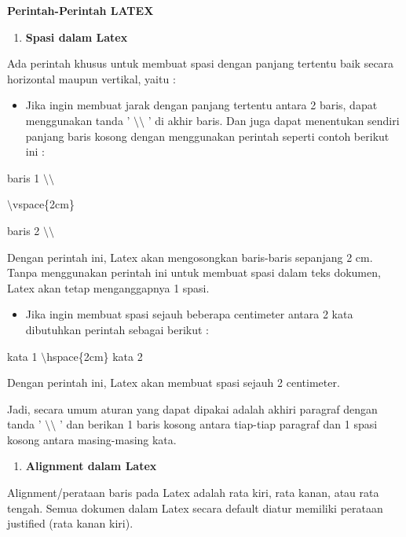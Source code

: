 \textbf{Perintah-Perintah LATEX}

\begin{enumerate}
\item \textbf{Spasi dalam Latex}
\setcounter{numberedCntB}{\theenumi}
\end{enumerate}
Ada perintah khusus untuk membuat spasi dengan panjang tertentu baik secara horizontal maupun vertikal, yaitu :

\begin{itemize}
\item Jika ingin membuat jarak dengan panjang tertentu antara 2 baris, dapat menggunakan tanda ' $\setminus$$\setminus$ ' di akhir baris. Dan juga dapat menentukan sendiri panjang baris kosong dengan menggunakan perintah seperti contoh berikut ini :
\end{itemize}
\hspace{0,2in}baris 1 $\setminus$$\setminus$

$\setminus$vspace\{2cm\}

baris 2 $\setminus$$\setminus$

\par \vspace{12pt}

Dengan perintah ini, Latex akan mengosongkan baris-baris sepanjang 2 cm. Tanpa menggunakan perintah ini untuk membuat spasi dalam teks dokumen, Latex akan tetap menganggapnya 1 spasi.

\begin{itemize}
\item Jika ingin membuat spasi sejauh beberapa centimeter antara 2 kata dibutuhkan perintah sebagai berikut :
\end{itemize}
\hspace{0,5in}kata 1 $\setminus$hspace\{2cm\} kata 2\par \vspace{12pt}

Dengan perintah ini, Latex akan membuat spasi sejauh 2 centimeter.

Jadi, secara umum aturan yang dapat dipakai adalah akhiri paragraf dengan tanda ' $\setminus$$\setminus$ ' dan berikan 1 baris kosong antara tiap-tiap paragraf dan 1 spasi kosong antara masing-masing kata.

\begin{enumerate}
\setcounter{enumi}{\thenumberedCntB}
\item \textbf{Alignment dalam Latex}
\setcounter{numberedCntB}{\theenumi}
\end{enumerate}
\hspace{0,5in}Alignment/perataan baris pada Latex adalah rata kiri, rata kanan, atau rata tengah. Semua dokumen dalam Latex secara default diatur memiliki perataan justified (rata kanan kiri).

